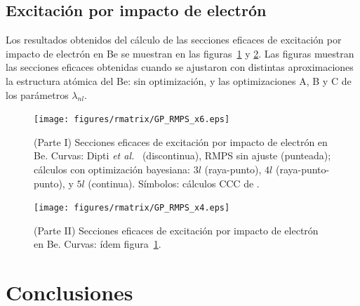 \subsection{Excitación por impacto de electrón}

Los resultados obtenidos del cálculo de las secciones eficaces de 
excitación por impacto de electrón en Be se muestran en las 
figuras~\ref{fig:crossBe-partI} y \ref{fig:crossBe-partII}. Las figuras 
muestran las secciones eficaces obtenidas cuando se ajustaron con 
distintas aproximaciones la estructura atómica del Be: sin optimización, 
y las optimizaciones A, B y C de los parámetros $\lambda_{nl}$.

\begin{figure}
\centering
\texttt{[image: figures/rmatrix/GP\_RMPS\_x6.eps]} 
\caption[Secciones eficaces de excitación de Be (Parte I).]
{(Parte I) Secciones eficaces de excitación por impacto de electrón en Be. 
Curvas: Dipti \textit{et al.}~\cite{Dipti:19} (discontinua), RMPS sin 
ajuste (punteada); cálculos con optimización bayesiana: 
$3l$ (raya-punto), 
$4l$ (raya-punto-punto), y
$5l$ (continua). 
Símbolos: cálculos CCC de \cite{Fursa:97}.}
\label{fig:crossBe-partI}
\end{figure}

\begin{figure}
\centering
\texttt{[image: figures/rmatrix/GP\_RMPS\_x4.eps]} 
\caption[Secciones eficaces de excitación de Be (Parte II).]
{(Parte II) Secciones eficaces de excitación por impacto de electrón en Be.
Curvas: ídem figura~\ref{fig:crossBe-partI}.}
\label{fig:crossBe-partII}
\end{figure}

\newpage
\section{Conclusiones}
